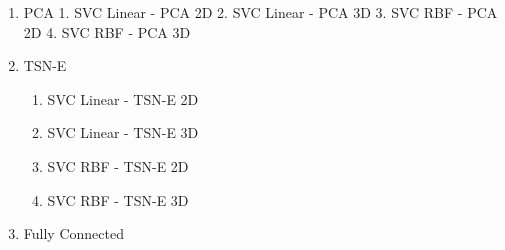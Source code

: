 \documentclass[11pt]{article}
\providecommand{\tightlist}{%
      \setlength{\itemsep}{0pt}\setlength{\parskip}{0pt}}
\begin{document}
\begin{enumerate}
\def\labelenumi{\arabic{enumi}.}
\tightlist
\item
  PCA 1. SVC Linear - PCA 2D 2. SVC Linear - PCA 3D 3. SVC RBF - PCA 2D
  4. SVC RBF - PCA 3D
\item
  TSN-E

  \begin{enumerate}
  \def\labelenumii{\arabic{enumii}.}
  \tightlist
  \item
    SVC Linear - TSN-E 2D
  \item
    SVC Linear - TSN-E 3D
  \item
    SVC RBF - TSN-E 2D
  \item
    SVC RBF - TSN-E 3D
  \end{enumerate}
\item
  Fully Connected
\end{enumerate}
\end{document}

